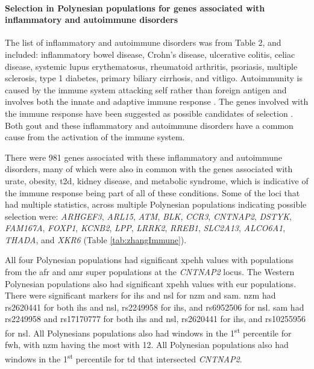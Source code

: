 \documentclass[twoside,openright]{report}
\let\oldparagraph\paragraph
\renewcommand{\paragraph}[1]{\oldparagraph{#1}\mbox{}}
\begin{document}
\endgroup{}

\paragraph{Selection in Polynesian populations for genes associated with
inflammatory and autoimmune
disorders}\label{selection-in-polynesian-populations-for-genes-associated-with-inflammatory-and-autoimmune-disorders}

The list of inflammatory and autoimmune disorders was from
\citet{Zhang2013a} Table 2, and included: inflammatory bowel disease,
Crohn's disease, ulcerative colitis, celiac disease, systemic lupus
erythematosus, rheumatoid arthritis, psoriasis, multiple sclerosis, type
1 diabetes, primary biliary cirrhosis, and vitligo. Autoimmunity is
caused by the immune system attacking self rather than foreign antigen
and involves both the innate and adaptive immune response
\citep{Waldner2009}. The genes involved with the immune response have
been suggested as possible candidates of selection \citep{Grossman2013}.
Both gout and these inflammatory and autoimmune disorders have a common
cause from the activation of the immune system.

There were 981 genes associated with these inflammatory and autoimmune
disorders, many of which were also in common with the genes associated
with urate, obesity, \gls{t2d}, kidney disease, and metabolic syndrome,
which is indicative of the immune response being part of all of these
conditions. Some of the loci that had multiple statistics, across
multiple Polynesian populations indicating possible selection were:
\emph{ARHGEF3}, \emph{ARL15}, \emph{ATM}, \emph{BLK}, \emph{CCR3},
\emph{CNTNAP2}, \emph{DSTYK}, \emph{FAM167A}, \emph{FOXP1},
\emph{KCNB2}, \emph{LPP}, \emph{LRRK2}, \emph{RREB1}, \emph{SLC2A13},
\emph{ALCO6A1}, \emph{THADA}, and \emph{XKR6} (Table
\ref{tab:zhangImmune}).

All four Polynesian populations had significant \gls{xpehh} values with
populations from the \gls{afr} and \gls{amr} super populations at the
\emph{CNTNAP2} locus. The Western Polynesian populations also had
significant \gls{xpehh} values with \gls{eur} populations. There were
significant markers for \gls{ihs} and \gls{nsl} for \gls{nzm} and
\gls{sam}. \Gls{nzm} had rs2620441 for both \gls{ihs} and \gls{nsl},
rs2249958 for \gls{ihs}, and rs6952506 for \gls{nsl}. \Gls{sam} had
rs2249958 and rs17170777 for both \gls{ihs} and \gls{nsl}, rs2620441 for
\gls{ihs}, and rs10255956 for \gls{nsl}. All Polynesians populations
also had windows in the 1\textsuperscript{st} percentile for \gls{fwh},
with \gls{nzm} having the most with 12. All Polynesian populations also
had windows in the 1\textsuperscript{st} percentile for \gls{td} that
intersected \emph{CNTNAP2}.
\end{document}

